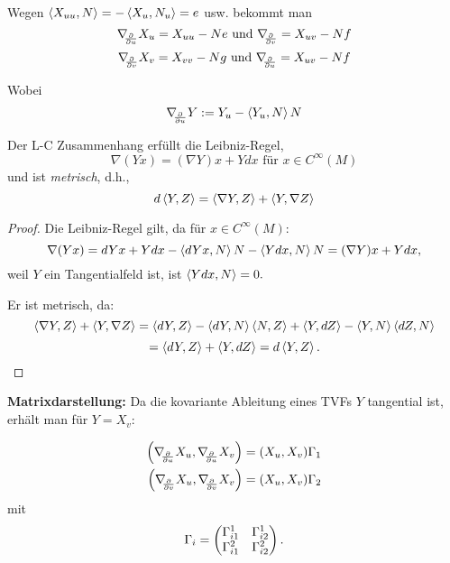 \begin{remark}
	
	Wegen $ \left \langle X_{uu},N \right\rangle= -\left \langle X_u,N_u \right\rangle= e $ usw. bekommt man 
		\[ \nabla_{\!\!{\partial\over \partial u}}X_u = X_{uu}-Ne \text{ und } \nabla_{\!\!{\partial\over \partial v}} = X_{uv}-Nf \]
		\[ \nabla_{\!\!{\partial\over \partial v}}X_v = X_{vv}-Ng \text{ und } \nabla_{\!\!{\partial\over \partial u}} = X_{uv}-Nf \]
	
	Wobei $$ \nabla_{\!\!{\partial\over \partial u}}Y := Y_u - \left \langle Y_u,N \right\rangle N $$
	
\end{remark}

\begin{lemma}
	
	Der L-C Zusammenhang erfüllt die Leibniz-Regel,
		\[ \nabla(Yx) = (\nabla Y)x + Ydx \text{ für } x \in C^\infty(M) \] 
	und ist \emph{metrisch}, d.h., 
		\[ d\left \langle Y,Z \right\rangle = \left \langle \nabla Y,Z \right\rangle + \left \langle Y,\nabla Z \right\rangle \]
	
\end{lemma}

\begin{proof}
	
	Die Leibniz-Regel gilt, da für $x \in C^\infty(M)$:
		\[ \nabla(Yx) = dYx + Ydx- \left \langle dYx,N \right\rangle N - \left \langle Ydx,N \right\rangle N = (\nabla Y)x + Ydx, \]
	weil $ Y $ ein Tangentialfeld ist, ist $ \left \langle Ydx,N \right\rangle = 0. $ 
	
	Er ist metrisch, da:
		\[  \left \langle \nabla Y,Z \right\rangle + \left \langle Y,\nabla Z \right\rangle = \left \langle dY,Z \right\rangle -\left \langle dY,N \right\rangle\left \langle N,Z \right\rangle + \left \langle Y,dZ \right\rangle - \left \langle Y,N \right\rangle\left \langle dZ,N \right\rangle \]
		\[ = \left \langle dY,Z \right\rangle + \left \langle Y,dZ \right\rangle = d\left \langle Y,Z \right\rangle. \]
	
\end{proof}

\textbf{Matrixdarstellung:} Da die kovariante Ableitung eines TVFs $ Y $ tangential ist, erhält man für $ Y = X_v :$

\begin{equation} \label{Eq:Gamma}
\begin{split}
		 \left(\nabla_{\!\!{\partial\over \partial u}}X_u,\nabla_{\!\!{\partial\over \partial u}}X_v \right) &= (X_u,X_v)\Gamma_1  \\
		 \left(\nabla_{\!\!{\partial\over \partial v}}X_u,\nabla_{\!\!{\partial\over \partial v}}X_v \right) &= (X_u,X_v)\Gamma_2 
\end{split}
\end{equation} 
	mit 
		\[ \Gamma_i = \begin{pmatrix} \Gamma_{i1}^1 & \Gamma_{i2}^1 \\ \Gamma_{i1}^2 & \Gamma_{i2}^2 \end{pmatrix}. \]
		
